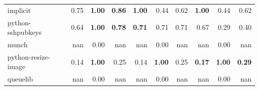 \documentclass[11pt,dvipdfmx]{jreport}
\begin{document}
\begin{table}{}
{\begin{tabular}{l||p{4em}|p{4em}|p{4em}||p{4em}|p{4em}|p{4em}||p{4em}|p{4em}|p{4em}}
            \hline \hline
            implicit & \multicolumn{1}{r|}{0.75} & \multicolumn{1}{r|}{\textbf{1.00}} & \multicolumn{1}{r||}{\textbf{0.86}} & \multicolumn{1}{r|}{\textbf{1.00}} & \multicolumn{1}{r|}{0.44} & \multicolumn{1}{r||}{0.62} & \multicolumn{1}{r|}{\textbf{1.00}} & \multicolumn{1}{r|}{0.44} & \multicolumn{1}{r}{0.62} \\
            python-sshpubkeys & \multicolumn{1}{r|}{0.64} & \multicolumn{1}{r|}{\textbf{1.00}} & \multicolumn{1}{r||}{\textbf{0.78}} & \multicolumn{1}{r|}{\textbf{0.71}} & \multicolumn{1}{r|}{0.71} & \multicolumn{1}{r||}{0.71} & \multicolumn{1}{r|}{0.67} & \multicolumn{1}{r|}{0.29} & \multicolumn{1}{r}{0.40} \\
            munch & \multicolumn{1}{r|}{nan} & \multicolumn{1}{r|}{0.00} & \multicolumn{1}{r||}{nan} & \multicolumn{1}{r|}{nan} & \multicolumn{1}{r|}{0.00} & \multicolumn{1}{r||}{nan} & \multicolumn{1}{r|}{nan} & \multicolumn{1}{r|}{0.00} & \multicolumn{1}{r}{nan} \\
            python-resize-image & \multicolumn{1}{r|}{0.14} & \multicolumn{1}{r|}{\textbf{1.00}} & \multicolumn{1}{r||}{0.25} & \multicolumn{1}{r|}{0.14} & \multicolumn{1}{r|}{\textbf{1.00}} & \multicolumn{1}{r||}{0.25} & \multicolumn{1}{r|}{\textbf{0.17}} & \multicolumn{1}{r|}{\textbf{1.00}} & \multicolumn{1}{r}{\textbf{0.29}} \\
            queuelib & \multicolumn{1}{r|}{nan} & \multicolumn{1}{r|}{0.00} & \multicolumn{1}{r||}{nan} & \multicolumn{1}{r|}{nan} & \multicolumn{1}{r|}{0.00} & \multicolumn{1}{r||}{nan} & \multicolumn{1}{r|}{nan} & \multicolumn{1}{r|}{0.00} & \multicolumn{1}{r}{nan} \\ \hline
        \end{tabular}
    }
\end{table}
\end{document}
